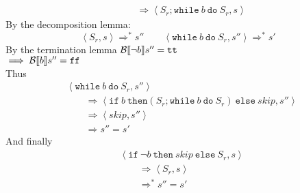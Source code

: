 \begin{exercise}
\begin{itemize}
\begin{itemize}
\begin{align*}
                    \\&\qquad\Rightarrow \left<S_r; \texttt{while}\ b\ \texttt{do}\ S_r, s\right>
                \end{align*}
                By the decomposition lemma:
                \[ \left<S_r, s\right> \Rightarrow^* s'' \qquad \left<\texttt{while}\ b\ \texttt{do}\ S_r, s''\right> \Rightarrow^* s' \]
                By the termination lemma $\mathcal{B} \llbracket  \neg b \rrbracket s'' = \texttt{tt}$ \\
                $\implies \mathcal{B} \llbracket  b \rrbracket s'' = \texttt{ff}$ \\
                Thus
                \begin{align*}
                    &\left<\texttt{while}\ b\ \texttt{do}\ S_r, s''\right>
                    \\&\qquad\Rightarrow \left<\texttt{if}\ b\ \texttt{then} (S_r; \texttt{while}\ b\ \texttt{do}\ S_r)\ \texttt{else}\ skip, s''\right>
                    \\&\qquad\Rightarrow \left<skip, s''\right>
                    \\&\qquad\Rightarrow s'' = s'
                \end{align*}
                And finally
                \begin{align*}
                    &\left<\texttt{if}\ \neg b\ \texttt{then}\ skip\ \texttt{else}\ S_r, s\right>
                    \\&\qquad\Rightarrow \left<S_r, s\right>
                    \\&\qquad\Rightarrow^* s'' = s'
                \end{align*}
            \end{itemize}
    \end{itemize}
\end{exercise}
